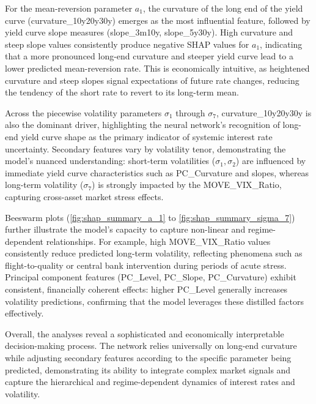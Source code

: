 For the mean-reversion parameter \(a_1\), the curvature of the long end of the yield curve (curvature\_10y20y30y) emerges as the most influential feature, followed by yield curve slope measures (slope\_3m10y, slope\_5y30y). High curvature and steep slope values consistently produce negative SHAP values for \(a_1\), indicating that a more pronounced long-end curvature and steeper yield curve lead to a lower predicted mean-reversion rate. This is economically intuitive, as heightened curvature and steep slopes signal expectations of future rate changes, reducing the tendency of the short rate to revert to its long-term mean.

Across the piecewise volatility parameters \(\sigma_1\) through \(\sigma_7\), curvature\_10y20y30y is also the dominant driver, highlighting the neural network’s recognition of long-end yield curve shape as the primary indicator of systemic interest rate uncertainty. Secondary features vary by volatility tenor, demonstrating the model's nuanced understanding: short-term volatilities (\(\sigma_1, \sigma_2\)) are influenced by immediate yield curve characteristics such as PC\_Curvature and slopes, whereas long-term volatility (\(\sigma_7\)) is strongly impacted by the MOVE\_VIX\_Ratio, capturing cross-asset market stress effects.

Beeswarm plots (\ref{fig:shap_summary_a_1} to \ref{fig:shap_summary_sigma_7}) further illustrate the model’s capacity to capture non-linear and regime-dependent relationships. For example, high MOVE\_VIX\_Ratio values consistently reduce predicted long-term volatility, reflecting phenomena such as flight-to-quality or central bank intervention during periods of acute stress. Principal component features (PC\_Level, PC\_Slope, PC\_Curvature) exhibit consistent, financially coherent effects: higher PC\_Level generally increases volatility predictions, confirming that the model leverages these distilled factors effectively.

Overall, the analyses reveal a sophisticated and economically interpretable decision-making process. The network relies universally on long-end curvature while adjusting secondary features according to the specific parameter being predicted, demonstrating its ability to integrate complex market signals and capture the hierarchical and regime-dependent dynamics of interest rates and volatility.

